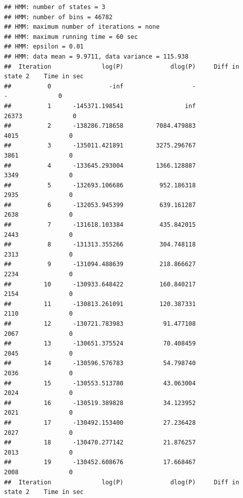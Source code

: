 \documentclass[11pt]{article}\usepackage[]{graphicx}\usepackage[]{color}
\makeatletter
\newenvironment{kframe}{%
 \def\at@end@of@kframe{}%
 \ifinner\ifhmode%
  \def\at@end@of@kframe{\end{minipage}}%
  \begin{minipage}{\columnwidth}%
 \fi\fi%
 \def\FrameCommand##1{\hskip\@totalleftmargin \hskip-\fboxsep
 \colorbox{shadecolor}{##1}\hskip-\fboxsep
     \hskip-\linewidth \hskip-\@totalleftmargin \hskip\columnwidth}%
 \MakeFramed {\advance\hsize-\width
   \@totalleftmargin\z@ \linewidth\hsize
   \@setminipage}}%
 {\par\unskip\endMakeFramed%
 \at@end@of@kframe}
\newenvironment{knitrout}{}{} %
\makeatother
\begin{document}
\begin{scriptsize}
\begin{knitrout}
\begin{kframe}
{\ttfamily\noindent\itshape\color{messagecolor}{\#\# Replaced read counts > 70 (99.9\% quantile) by 70 in 44 bins. Set option 'read.cutoff.quantile=1' to disable this filtering. This filtering was done to increase the speed of the HMM and should not affect the results.\\\#\# ------------------------------------ Try 1 of 1 -------------------------------------}}\begin{verbatim}
## HMM: number of states = 3
## HMM: number of bins = 46782
## HMM: maximum number of iterations = none
## HMM: maximum running time = 60 sec
## HMM: epsilon = 0.01
## HMM: data mean = 9.9711, data variance = 115.938
##  Iteration              log(P)             dlog(P)     Diff in state 2    Time in sec
##          0                -inf                   -                   -              0
##          1      -145371.198541                 inf               26373              0
##          2      -138286.718658         7084.479883                4015              0
##          3      -135011.421891         3275.296767                3861              0
##          4      -133645.293004         1366.128887                3349              0
##          5      -132693.106686          952.186318                2935              0
##          6      -132053.945399          639.161287                2638              0
##          7      -131618.103384          435.842015                2443              0
##          8      -131313.355266          304.748118                2313              0
##          9      -131094.488639          218.866627                2234              0
##         10      -130933.648422          160.840217                2154              0
##         11      -130813.261091          120.387331                2110              0
##         12      -130721.783983           91.477108                2067              0
##         13      -130651.375524           70.408459                2045              0
##         14      -130596.576783           54.798740                2036              0
##         15      -130553.513780           43.063004                2024              0
##         16      -130519.389828           34.123952                2021              0
##         17      -130492.153400           27.236428                2027              0
##         18      -130470.277142           21.876257                2013              0
##         19      -130452.608676           17.668467                2008              0
##  Iteration              log(P)             dlog(P)     Diff in state 2    Time in sec

\end{verbatim}
\end{kframe}
\end{knitrout}
\end{scriptsize}
\end{document}
